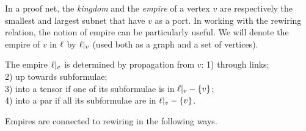\documentclass[conference]{IEEEtran}
\begin{document}
%
%
%
%



In a proof net, the \emph{kingdom} and the \emph{empire} of a vertex $v$ are respectively the smallest and largest subnet that have $v$ as a port.
%
In working with the rewiring relation, the notion of empire can be particularly useful.
%
\color{red} 
We will denote the empire of $v$ in $\ell$ by $\emp v$ (used both as a graph and a set of vertices).
\color{black}


\begin{proposition}
\label{prop:empire propagation}
The empire $\emp v$ is determined by propagation from $v$: 1) through links;\\ \color{red} 2) up towards subformulae;\\ 3) into a tensor if one of its subformulae is in $\emp v-\{v\}$;\\ 4) into a par if all its subformulae are in $\emp v-\{v\}$.%
\end{proposition}


Empires are connected to rewiring in the following ways.
\end{document}
